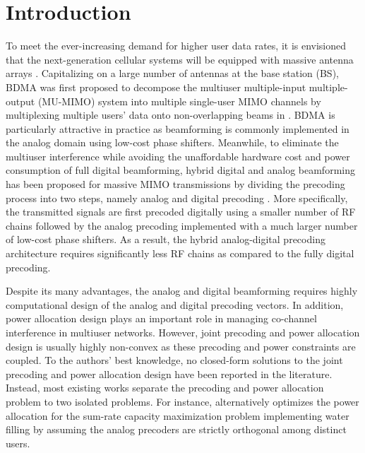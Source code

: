 \documentclass[10pt,journal,twocolumn,twoside]{IEEEtran}
\begin{document}

\section{Introduction}\label{sec:introduction}
To meet the ever-increasing demand for higher user data rates, it is envisioned that the next-generation cellular systems will be equipped with massive antenna arrays \cite{molisch2005capacity}. Capitalizing on a large number of antennas at the base station (BS), BDMA was first proposed to decompose the multiuser multiple-input multiple-output (MU-MIMO) system into multiple single-user MIMO channels by multiplexing multiple users' data onto non-overlapping beams in \cite{sun2015beam}. BDMA is particularly attractive in practice as beamforming is commonly implemented in the analog domain using low-cost phase shifters. Meanwhile, to eliminate the multiuser interference while avoiding the unaffordable hardware cost and power consumption of full digital beamforming, hybrid digital and analog beamforming has been proposed for massive MIMO transmissions by dividing the precoding process into two steps, namely analog and digital precoding \cite{alkhateeb2014channel}. More specifically, the transmitted signals are first precoded digitally using a smaller number of RF chains followed by the analog precoding implemented with a much larger number of low-cost phase shifters. As a result, the hybrid analog-digital precoding architecture requires significantly less RF chains as compared to the fully digital precoding.

Despite its many advantages, the analog and digital beamforming requires highly computational design of the analog and digital precoding vectors. In addition, power allocation design plays an important role in managing co-channel interference in multiuser networks. However, joint precoding and power allocation design is usually highly non-convex as these precoding and power constraints are coupled. To the authors' best knowledge, no closed-form solutions to the joint precoding and power allocation design have been reported in the literature. Instead, most existing works separate the precoding and power allocation problem to two isolated problems. For instance, \cite{sohrabi2016hybrid} alternatively optimizes the power allocation for the sum-rate capacity maximization problem implementing water filling by assuming the analog precoders are strictly orthogonal among distinct users. 
\end{document}

